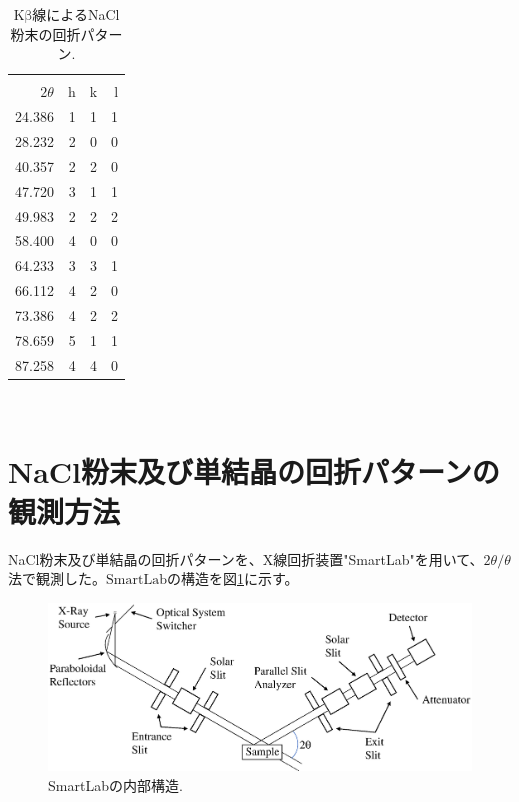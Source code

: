 \documentclass[11pt,a4j,uplatex]{jsarticle}
\begin{document}
\begin{table}[htbp]
 \begin{center}
  \caption{$\mathrm{K\beta}$線によるNaCl粉末の回折パターン.}
  \begin{tabular}{|r|r|r|r|}\hline
             & \multicolumn{3}{c|}{}         \\
   $2\theta$ & h                     & k & l \\ \hline\hline
   24.386    & 1                     & 1 & 1 \\
   28.232    & 2                     & 0 & 0 \\
   40.357    & 2                     & 2 & 0 \\
   47.720    & 3                     & 1 & 1 \\
   49.983    & 2                     & 2 & 2 \\
   58.400    & 4                     & 0 & 0 \\
   64.233    & 3                     & 3 & 1 \\
   66.112    & 4                     & 2 & 0 \\
   73.386    & 4                     & 2 & 2 \\
   78.659    & 5                     & 1 & 1 \\
   87.258    & 4                     & 4 & 0 \\ \hline
  \end{tabular}
  \label{kbeta}
 \end{center}
\end{table}

\newpage
\,
\newpage
\,
\section{NaCl粉末及び単結晶の回折パターンの観測方法}

NaCl粉末及び単結晶の回折パターンを、X線回折装置"SmartLab"を用いて、$2\theta/\theta$法で観測した。$\mathrm{SmartLab}$の構造を図\ref{smartlab}に示す。


\begin{figure}[htb]
 \centering
 \includegraphics[clip,width=12cm]{XRD.eps}
 \caption{SmartLabの内部構造.}
 \label{smartlab}
\end{figure}
\end{document}
